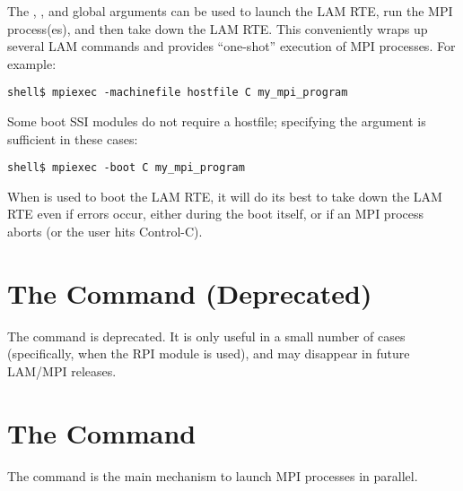 The , , and  global
arguments can be used to launch the LAM RTE, run the MPI process(es),
and then take down the LAM RTE.  This conveniently wraps up several
LAM commands and provides ``one-shot'' execution of MPI processes.
For example:

\lstset{style=lam-cmdline}
\begin{lstlisting}
shell$ mpiexec -machinefile hostfile C my_mpi_program
\end{lstlisting}

Some boot SSI modules do not require a hostfile; specifying the
 argument is sufficient in these cases:

\lstset{style=lam-cmdline}
\begin{lstlisting}
shell$ mpiexec -boot C my_mpi_program
\end{lstlisting}

When  is used to boot the LAM RTE, it will do its best to
take down the LAM RTE even if errors occur, either during the boot
itself, or if an MPI process aborts (or the user hits Control-C).


\section{The  Command (Deprecated)}
\label{sec:commands-mpimsg}

The  command is deprecated.  It is only useful in a small
number of cases (specifically, when the  RPI module is
used), and may disappear in future LAM/MPI releases.


\section{The  Command}
\label{sec:commands-mpirun}

The  command is the main mechanism to launch MPI processes
in parallel.  


